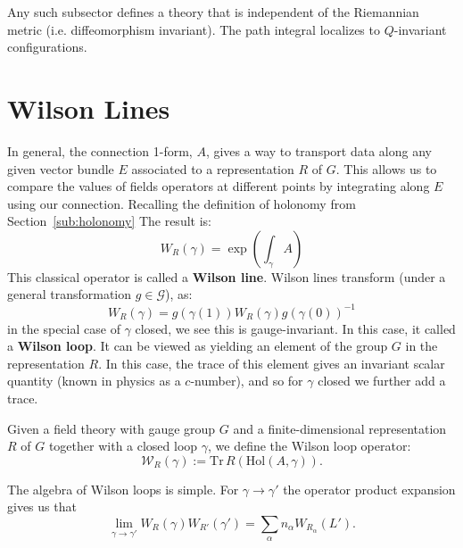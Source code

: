 	\begin{prop}
		Any such subsector defines a theory that is independent of the Riemannian metric (i.e. diffeomorphism invariant). The path integral localizes to $Q$-invariant configurations.
	\end{prop}




\section{Wilson Lines} %
\label{sec:wilson_lines}

	In general, the connection 1-form, $A$, gives a way to transport data along any given vector bundle $E$ associated to a representation $R$ of $G$. This allows us to compare the values of fields operators at different points by integrating along $E$ using our connection. Recalling the definition of holonomy from Section~\ref{sub:holonomy} The result is: 
	\begin{equation}
		W_R (\gamma) = \exp\left(\int_\gamma A \right)
	\end{equation}
	This classical operator is called a \textbf{Wilson line}.
	Wilson lines transform (under a general transformation $g \in \mathcal G$), as:
	\begin{equation}
		W_R(\gamma) = g(\gamma(1)) W_R(\gamma)  g(\gamma(0))^{-1}
	\end{equation}
	in the special case of $\gamma$ closed, we see this is gauge-invariant. In this case, it called a \textbf{Wilson loop}. It can be viewed as yielding an element of the group $G$ in the representation $R$. In this case, the trace of this element gives an invariant scalar quantity (known in physics as a $c$-number), and so for $\gamma$ closed we further add a trace.
	\begin{defn}
		Given a field theory with gauge group $G$ and a finite-dimensional representation $R$ of $G$ together with a closed loop $\gamma$, we define the Wilson loop operator:
		\begin{equation}
			\mathcal W_{R}(\gamma) := \mathrm{Tr}\, R( \mathrm{Hol}(A, \gamma)).
		\end{equation}
	\end{defn}
\noindent	The algebra of Wilson loops is simple. For $\gamma \to \gamma'$ the operator product expansion gives us that
	\begin{equation}
		\lim_{\gamma \to \gamma'} W_R (\gamma) W_{R'} (\gamma') = \sum_\alpha n_\alpha W_{R_\alpha}(L').
	\end{equation}

